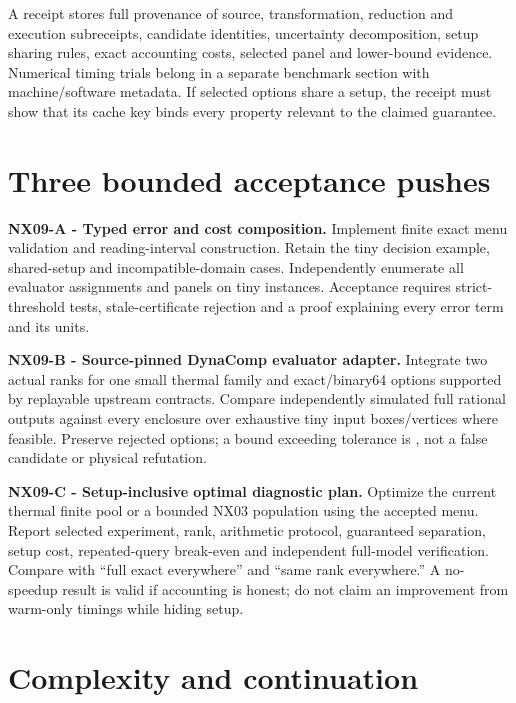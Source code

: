 \documentclass[
  11pt,
  a4paper,
]{report}
\let\nxtexttt\texttt
\renewcommand{\texttt}[1]{\nxtexttt{\seqsplit{#1}}}
\begin{document}
A \texttt{singularity.fidelity-design/1} receipt stores full provenance
of source, transformation, reduction and execution subreceipts,
candidate identities, uncertainty decomposition, setup sharing rules,
exact accounting costs, selected panel and lower-bound evidence.
Numerical timing trials belong in a separate benchmark section with
machine/software metadata. If selected options share a setup, the
receipt must show that its cache key binds every property relevant to
the claimed guarantee.

\hypertarget{three-bounded-acceptance-pushes-1}{%
\section{Three bounded acceptance
pushes}\label{three-bounded-acceptance-pushes-1}}

\textbf{NX09-A - Typed error and cost composition.} Implement finite
exact menu validation and reading-interval construction. Retain the tiny
decision example, shared-setup and incompatible-domain cases.
Independently enumerate all evaluator assignments and panels on tiny
instances. Acceptance requires strict-threshold tests, stale-certificate
rejection and a proof explaining every error term and its units.

\textbf{NX09-B - Source-pinned DynaComp evaluator adapter.} Integrate
two actual ranks for one small thermal family and exact/binary64 options
supported by replayable upstream contracts. Compare independently
simulated full rational outputs against every enclosure over exhaustive
tiny input boxes/vertices where feasible. Preserve rejected options; a
bound exceeding tolerance is \texttt{not\_certified}, not a false
candidate or physical refutation.

\textbf{NX09-C - Setup-inclusive optimal diagnostic plan.} Optimize the
current thermal finite pool or a bounded NX03 population using the
accepted menu. Report selected experiment, rank, arithmetic protocol,
guaranteed separation, setup cost, repeated-query break-even and
independent full-model verification. Compare with ``full exact
everywhere'' and ``same rank everywhere.'' A no-speedup result is valid
if accounting is honest; do not claim an improvement from warm-only
timings while hiding setup.

\hypertarget{complexity-and-continuation}{%
\section{Complexity and
continuation}\label{complexity-and-continuation}}
\end{document}
